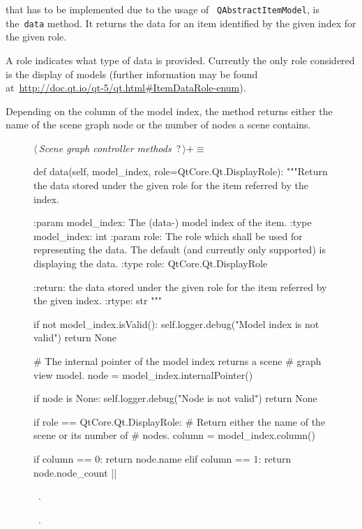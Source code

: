 \documentclass[%
    a4paper,    %
    justified,  %
    nobib,      %
    openany     %
]{tufte-book}
\makeatletter
\renewcommand{\label}[1]{\@tufte@label{##1}}%
\makeatother
\begin{document}
 that has to be implemented due to the usage of
~\verb=QAbstractItemModel=, is the~\verb=data= method. It returns the data for
an item identified by the given index for the given role.

A role indicates what type of data is provided. Currently the only role
considered is the display of models (further information may be found
at~\url{http://doc.qt.io/qt-5/qt.html#ItemDataRole-enum}).

Depending on the column of the model index, the method returns either the name
of the scene graph node or the number of nodes a scene contains.

\begin{figure}
\begin{flushleft} \small
\begin{minipage}{\linewidth}\label{scrap35}\raggedright\small
{} $\langle\,${\itshape Scene graph controller methods}\nobreak\ {\footnotesize {?}}$\,\rangle+\equiv$
\vspace{-1ex}
\begin{pythoncode}
def data(self, model_index, role=QtCore.Qt.DisplayRole):
    """Return the data stored under the given role for the item
    referred by the index.

    :param model_index: The (data-) model index of the item.
    :type model_index: int
    :param role: The role which shall be used for representing
                 the data. The default (and currently only
                 supported) is displaying the data.
    :type role:  QtCore.Qt.DisplayRole

    :return: the data stored under the given role for the item
             referred by the given index.
    :rtype:  str
    """

    if not model_index.isValid():
        self.logger.debug("Model index is not valid")
        return None

    # The internal pointer of the model index returns a scene
    # graph view model.
    node = model_index.internalPointer()

    if node is None:
        self.logger.debug("Node is not valid")
        return None

    if role == QtCore.Qt.DisplayRole:
        # Return either the name of the scene or its number of
        # nodes.
        column = model_index.column()

        if column == 0:
            return node.name
        elif column == 1:
            return node.node_count
|\NWsep|
\end{pythoncode}
\vspace{1.5ex}
\footnotesize
\begin{list}{}{\setlength{\itemsep}{-\parsep}\setlength{\itemindent}{-\leftmargin}}
\item \NWtxtMacroDefBy\ .
\item \NWtxtMacroRefIn\ .


\end{list}
\end{minipage}
\end{flushleft}
\end{figure}
\end{document}

